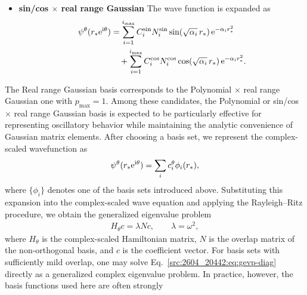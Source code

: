 \begin{itemize}
\begin{align}
        &=
        \sum_{p=0}^{p_{\max}}
        \sum_{i=1}^{i_{\max}}
        C_i^{p} N_i^{p}
        \left( \sqrt{\alpha_i}\, r_* \right)^p
        \rme^{-\alpha_i r_*^2}.
    \end{align}
    $p_{\max}$ is the highest degree of the polynomial of~$r_*$;
    for each~$i$, the basis is spanned by~$1$, $r_*$, $r_*^2$, \dots, $r_*^{p_{\max}}$ with the Gaussian factor.
    \item \textbf{sin/cos $\times$ real range Gaussian}
    The wave function is expanded as
    \begin{align}
        \psi^\theta(r_* \mathrm{e}^{\mathrm{i}\theta})
        &=
        \sum_{i=1}^{i_{\max}}
        C_i^{\sin} N_i^{\sin}
        \sin\!\left( \sqrt{\alpha_i}\, r_* \right)
        \mathrm{e}^{-\alpha_i r_*^2}
        \notag\\
        &\quad
        +
        \sum_{i=1}^{i_{\max}}
        C_i^{\cos} N_i^{\cos}
        \cos\!\left( \sqrt{\alpha_i}\, r_* \right)
        \mathrm{e}^{-\alpha_i r_*^2}.
    \end{align}
\end{itemize}
The Real range Gaussian basis corresponds to the Polynomial $\times$ real range Gaussian one with $p_{\max}=1$.
Among these candidates, the Polynomial or sin/cos $\times$ real range Gaussian basis is expected to be
particularly effective for representing oscillatory behavior while maintaining
the analytic convenience of Gaussian matrix elements.
After choosing a basis set, we represent the complex-scaled wavefunction as
\begin{align}
    \psi^\theta(r_* \mathrm{e}^{\mathrm{i}\theta})
    = \sum_i c_i^\theta \phi_i(r_*),
\end{align}
where $\{\phi_i\}$ denotes one of the basis sets introduced above.
Substituting this expansion into the complex-scaled wave equation and applying
the Rayleigh--Ritz procedure, we obtain the generalized eigenvalue problem
\begin{align}
    H_\theta c
    =
    \lambda N c,
    \qquad
    \lambda = \omega^2,
    \label{src:2604_20442:eq:gevp-diag}
\end{align}
where $H_\theta$ is the complex-scaled Hamiltonian matrix,
$N$ is the overlap matrix of the non-orthogonal basis,
and $c$ is the coefficient vector.
For basis sets with sufficiently mild overlap, one may solve
Eq.~\eqref{src:2604_20442:eq:gevp-diag} directly as a generalized complex eigenvalue problem.
In practice, however, the basis functions used here are often strongly
